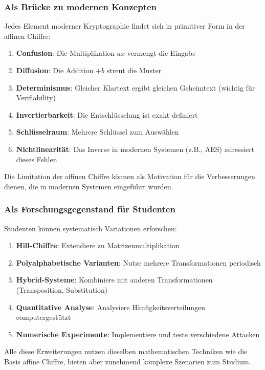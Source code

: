 ﻿\documentclass[12pt,a4paper]{article}
\begin{document}
	\subsubsection{Als Brücke zu modernen Konzepten}
	
	Jedes Element moderner Kryptographie findet sich in primitiver Form in der affinen Chiffre:
	
	\begin{enumerate}
		\item \textbf{Confusion}: Die Multiplikation $ax$ vermengt die Eingabe
		\item \textbf{Diffusion}: Die Addition $+b$ streut die Muster
		\item \textbf{Determinismus}: Gleicher Klartext ergibt gleichen Geheimtext (wichtig für Verifiability)
		\item \textbf{Invertierbarkeit}: Die Entschlüsselung ist exakt definiert
		\item \textbf{Schlüsselraum}: Mehrere Schlüssel zum Auswählen
		\item \textbf{Nichtlinearität}: Das Inverse in modernen Systemen (z.B., AES) adressiert dieses Fehlen
	\end{enumerate}
	
	Die Limitation der affinen Chiffre können als Motivation für die Verbesserungen dienen, die in modernen Systemen eingeführt wurden.
	
	\subsubsection{Als Forschungsgegenstand für Studenten}
	
	Studenten können systematisch Variationen erforschen:
	
	\begin{enumerate}
		\item \textbf{Hill-Chiffre}: Extendiere zu Matrizenmultiplikation
		\item \textbf{Polyalphabetische Varianten}: Nutze mehrere Transformationen periodisch
		\item \textbf{Hybrid-Systeme}: Kombiniere mit anderen Transformationen (Transposition, Substitution)
		\item \textbf{Quantitative Analyse}: Analysiere Häufigkeitsverteilungen computergestützt
		\item \textbf{Numerische Experimente}: Implementiere und teste verschiedene Attacken
	\end{enumerate}
	
	Alle diese Erweiterungen nutzen dieselben mathematischen Techniken wie die Basis affine Chiffre, bieten aber zunehmend komplexe Szenarien zum Studium.
	
\end{document}
